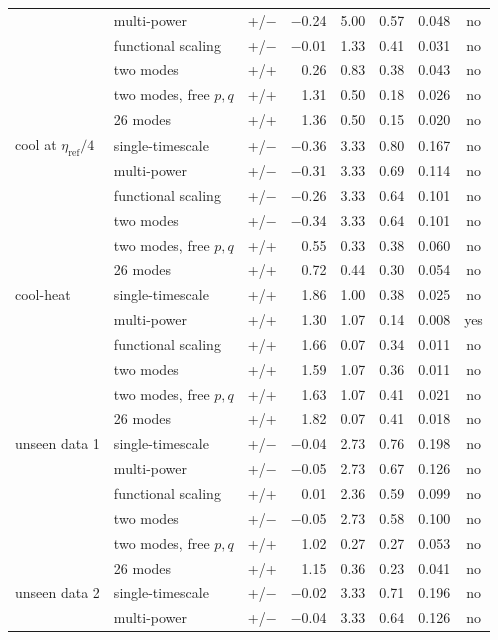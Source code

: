 \begin{longtable}{llcrrrrc}
 & multi-power & +/$-$ & $-$0.24 & 5.00 & 0.57 & 0.048 & no\\
 & functional scaling & +/$-$ & $-$0.01 & 1.33 & 0.41 & 0.031 & no\\
 & two modes & +/+ & 0.26 & 0.83 & 0.38 & 0.043 & no\\
 & two modes, free $p,q$ & +/+ & 1.31 & 0.50 & 0.18 & 0.026 & no\\
 & 26 modes & +/+ & 1.36 & 0.50 & 0.15 & 0.020 & no\\
\addlinespace
cool at $\eta_{\mathrm{ref}}/4$ & single-timescale & +/$-$ & $-$0.36 & 3.33 & 0.80 & 0.167 & no\\
 & multi-power & +/$-$ & $-$0.31 & 3.33 & 0.69 & 0.114 & no\\
 & functional scaling & +/$-$ & $-$0.26 & 3.33 & 0.64 & 0.101 & no\\
 & two modes & +/$-$ & $-$0.34 & 3.33 & 0.64 & 0.101 & no\\
 & two modes, free $p,q$ & +/+ & 0.55 & 0.33 & 0.38 & 0.060 & no\\
 & 26 modes & +/+ & 0.72 & 0.44 & 0.30 & 0.054 & no\\
\addlinespace
cool-heat & single-timescale & +/+ & 1.86 & 1.00 & 0.38 & 0.025 & no\\
 & multi-power & +/+ & 1.30 & 1.07 & 0.14 & 0.008 & yes\\
 & functional scaling & +/+ & 1.66 & 0.07 & 0.34 & 0.011 & no\\
 & two modes & +/+ & 1.59 & 1.07 & 0.36 & 0.011 & no\\
 & two modes, free $p,q$ & +/+ & 1.63 & 1.07 & 0.41 & 0.021 & no\\
 & 26 modes & +/+ & 1.82 & 0.07 & 0.41 & 0.018 & no\\
\addlinespace
unseen data 1 & single-timescale & +/$-$ & $-$0.04 & 2.73 & 0.76 & 0.198 & no\\
 & multi-power & +/$-$ & $-$0.05 & 2.73 & 0.67 & 0.126 & no\\
 & functional scaling & +/+ & 0.01 & 2.36 & 0.59 & 0.099 & no\\
 & two modes & +/$-$ & $-$0.05 & 2.73 & 0.58 & 0.100 & no\\
 & two modes, free $p,q$ & +/+ & 1.02 & 0.27 & 0.27 & 0.053 & no\\
 & 26 modes & +/+ & 1.15 & 0.36 & 0.23 & 0.041 & no\\
\addlinespace
unseen data 2 & single-timescale & +/$-$ & $-$0.02 & 3.33 & 0.71 & 0.196 & no\\
 & multi-power & +/$-$ & $-$0.04 & 3.33 & 0.64 & 0.126 & no\\

\end{longtable}
